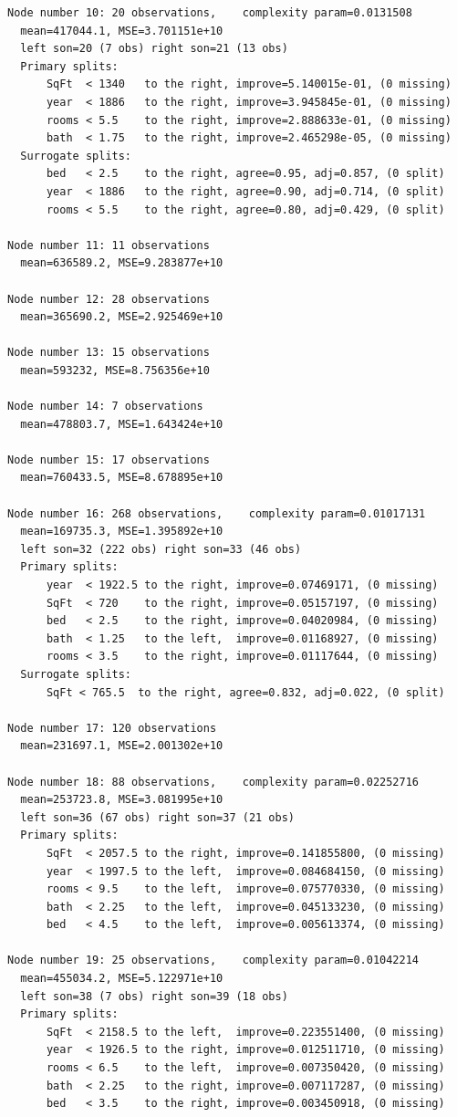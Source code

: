 \documentclass[11pt,a4paper]{article}
\begin{document}
\begin{lstlisting}[style=console]
Node number 10: 20 observations,    complexity param=0.0131508
  mean=417044.1, MSE=3.701151e+10 
  left son=20 (7 obs) right son=21 (13 obs)
  Primary splits:
      SqFt  < 1340   to the right, improve=5.140015e-01, (0 missing)
      year  < 1886   to the right, improve=3.945845e-01, (0 missing)
      rooms < 5.5    to the right, improve=2.888633e-01, (0 missing)
      bath  < 1.75   to the right, improve=2.465298e-05, (0 missing)
  Surrogate splits:
      bed   < 2.5    to the right, agree=0.95, adj=0.857, (0 split)
      year  < 1886   to the right, agree=0.90, adj=0.714, (0 split)
      rooms < 5.5    to the right, agree=0.80, adj=0.429, (0 split)

Node number 11: 11 observations
  mean=636589.2, MSE=9.283877e+10 

Node number 12: 28 observations
  mean=365690.2, MSE=2.925469e+10 

Node number 13: 15 observations
  mean=593232, MSE=8.756356e+10 

Node number 14: 7 observations
  mean=478803.7, MSE=1.643424e+10 

Node number 15: 17 observations
  mean=760433.5, MSE=8.678895e+10 

Node number 16: 268 observations,    complexity param=0.01017131
  mean=169735.3, MSE=1.395892e+10 
  left son=32 (222 obs) right son=33 (46 obs)
  Primary splits:
      year  < 1922.5 to the right, improve=0.07469171, (0 missing)
      SqFt  < 720    to the right, improve=0.05157197, (0 missing)
      bed   < 2.5    to the right, improve=0.04020984, (0 missing)
      bath  < 1.25   to the left,  improve=0.01168927, (0 missing)
      rooms < 3.5    to the right, improve=0.01117644, (0 missing)
  Surrogate splits:
      SqFt < 765.5  to the right, agree=0.832, adj=0.022, (0 split)

Node number 17: 120 observations
  mean=231697.1, MSE=2.001302e+10 

Node number 18: 88 observations,    complexity param=0.02252716
  mean=253723.8, MSE=3.081995e+10 
  left son=36 (67 obs) right son=37 (21 obs)
  Primary splits:
      SqFt  < 2057.5 to the right, improve=0.141855800, (0 missing)
      year  < 1997.5 to the left,  improve=0.084684150, (0 missing)
      rooms < 9.5    to the left,  improve=0.075770330, (0 missing)
      bath  < 2.25   to the left,  improve=0.045133230, (0 missing)
      bed   < 4.5    to the left,  improve=0.005613374, (0 missing)

Node number 19: 25 observations,    complexity param=0.01042214
  mean=455034.2, MSE=5.122971e+10 
  left son=38 (7 obs) right son=39 (18 obs)
  Primary splits:
      SqFt  < 2158.5 to the left,  improve=0.223551400, (0 missing)
      year  < 1926.5 to the right, improve=0.012511710, (0 missing)
      rooms < 6.5    to the left,  improve=0.007350420, (0 missing)
      bath  < 2.25   to the right, improve=0.007117287, (0 missing)
      bed   < 3.5    to the right, improve=0.003450918, (0 missing)


\end{lstlisting}
\end{document}
